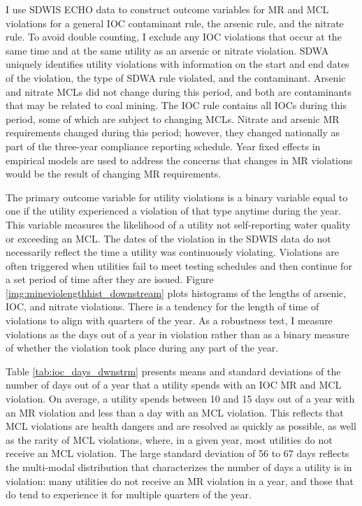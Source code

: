 \documentclass{article}
\begin{document}
I use SDWIS ECHO data to construct outcome variables for MR and MCL violations for a general IOC contaminant rule, the arsenic rule, and the nitrate rule. To avoid double counting, I exclude any IOC violations that occur at the same time and at the same utility as an arsenic or nitrate violation. SDWA uniquely identifies utility violations with information on the start and end dates of the violation, the type of SDWA rule violated, and the contaminant. Arsenic and nitrate MCLs did not change during this period, and both are contaminants that may be related to coal mining. The IOC rule contains all IOCs during this period, some of which are subject to changing MCLs. Nitrate and arsenic MR requirements changed during this period; however, they changed nationally as part of the three-year compliance reporting schedule. Year fixed effects in empirical models are used to address the concerns that changes in MR violations would be the result of changing MR requirements. 

The primary outcome variable for utility violations is a binary variable equal to one if the utility experienced a violation of that type anytime during the year. This variable measures the likelihood of a utility not self-reporting water quality or exceeding an MCL. The dates of the violation in the SDWIS data do not necessarily reflect the time a utility was continuously violating. Violations are often triggered when utilities fail to meet testing schedules and then continue for a set period of time after they are issued. Figure \ref{img:mineviolengthhist_downstream} plots histograms of the lengths of arsenic, IOC, and nitrate violations. There is a tendency for the length of time of violations to align with quarters of the year. As a robustness test, I measure violations as the days out of a year in violation rather than as a binary measure of whether the violation took place during any part of the year.

Table \ref{tab:ioc_days_dwnstrm} presents means and standard deviations of the number of days out of a year that a utility spends with an IOC MR and MCL violation. On average, a utility spends between 10 and 15 days out of a year with an MR violation and less than a day with an MCL violation. This reflects that MCL violations are health dangers and are resolved as quickly as possible, as well as the rarity of MCL violations, where, in a given year, most utilities do not receive an MCL violation. The large standard deviation of 56 to 67 days reflects the multi-modal distribution that characterizes the number of days a utility is in violation: many utilities do not receive an MR violation in a year, and those that do tend to experience it for multiple quarters of the year. 
\end{document}
